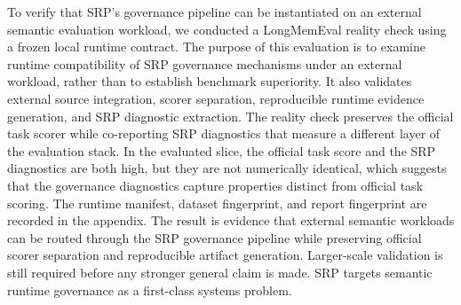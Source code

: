 {}\markdownRendererSectionBegin
{}\markdownRendererInterblockSeparator
{}To verify that SRP's governance pipeline can be instantiated on an external semantic evaluation workload, we conducted a LongMemEval reality check using a frozen local runtime contract. The purpose of this evaluation is to examine runtime compatibility of SRP governance mechanisms under an external workload, rather than to establish benchmark superiority. It also validates external source integration, scorer separation, reproducible runtime evidence generation, and SRP diagnostic extraction.\markdownRendererParagraphSeparator
{}The reality check preserves the official task scorer while co-reporting SRP diagnostics that measure a different layer of the evaluation stack. In the evaluated slice, the official task score and the SRP diagnostics are both high, but they are not numerically identical, which suggests that the governance diagnostics capture properties distinct from official task scoring.\markdownRendererInterblockSeparator
{}\markdownRendererInterblockSeparator
{}The runtime manifest, dataset fingerprint, and report fingerprint are recorded in the appendix. The result is evidence that external semantic workloads can be routed through the SRP governance pipeline while preserving official scorer separation and reproducible artifact generation. Larger-scale validation is still required before any stronger general claim is made.\markdownRendererInterblockSeparator
{}
\markdownRendererSectionEnd 
\markdownRendererSectionEnd 
\markdownRendererSectionEnd \markdownRendererSectionBegin
{}\markdownRendererInterblockSeparator
{}SRP targets semantic runtime governance as a first-class systems problem.\markdownRendererInterblockSeparator
{}\markdownRendererSectionBegin
{}\markdownRendererInterblockSeparator
